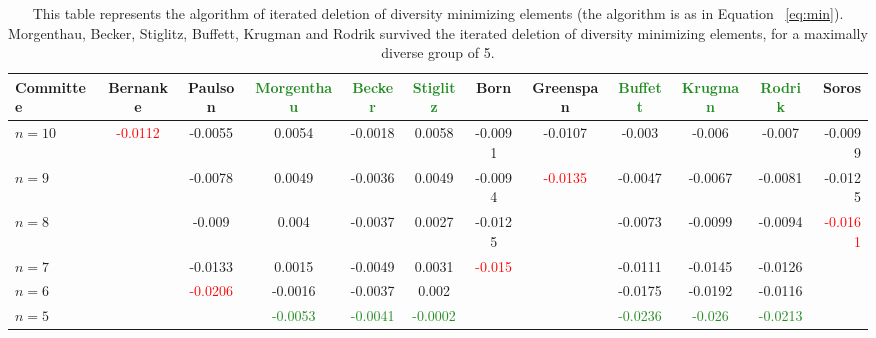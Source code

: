 \documentclass[12pt]{article}
\begin{document}
\begin{table}[h]\hspace*{-3.5cm}
\centering
\footnotesize
\begin{tabular}{l*{10}{c}r}
Committee &   Bernanke   &   Paulson   &   \textcolor{ForestGreen}{Morgenthau}   &   \textcolor{ForestGreen}{Becker}   &   \textcolor{ForestGreen}{Stiglitz}   &   Born   &   Greenspan   &   \textcolor{ForestGreen}{Buffett}   &   \textcolor{ForestGreen}{Krugman}   &   \textcolor{ForestGreen}{Rodrik}   &   Soros\\
\hline
$n=10$     & \textcolor{red}{-0.0112} & -0.0055 & 0.0054 & -0.0018 & 0.0058 & -0.0091 & -0.0107 & -0.003  & -0.006  & -0.007  & -0.0099  \\
$n=9$      &         & -0.0078 & 0.0049 & -0.0036 & 0.0049 & -0.0094 & \textcolor{red}{-0.0135} & -0.0047 & -0.0067 & -0.0081 & -0.0125\\
$n=8$      &         & -0.009  &  0.004 & -0.0037 & 0.0027 & -0.0125 &         & -0.0073 & -0.0099 & -0.0094 & \textcolor{red}{-0.0161}\\
$n=7$      &         & -0.0133 & 0.0015 & -0.0049 & 0.0031 & \textcolor{red}{-0.015}  &         & -0.0111 & -0.0145 & -0.0126 &        \\
$n=6$      &         & \textcolor{red}{-0.0206} &-0.0016 & -0.0037 & 0.002  &         &         & -0.0175 & -0.0192 & -0.0116 &        \\
\hline
$n=5$      &         &         &\textcolor{ForestGreen}{-0.0053} & \textcolor{ForestGreen}{-0.0041} & \textcolor{ForestGreen}{-0.0002}&         &         & \textcolor{ForestGreen}{-0.0236} & \textcolor{ForestGreen}{-0.026}  & \textcolor{ForestGreen}{-0.0213} &        \\
\end{tabular} \hspace*{-3.5cm}
\caption{This table represents the algorithm of iterated deletion of diversity minimizing elements (the algorithm is as in Equation ~\ref{eq:min}). Morgenthau, Becker, Stiglitz, Buffett, Krugman and Rodrik survived the iterated deletion of diversity minimizing elements, for a maximally diverse group of 5.} \label{table:minimize}
\end{table}
\end{document}
